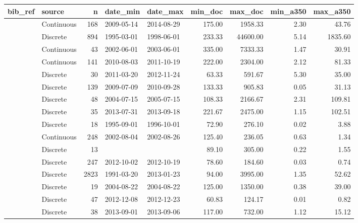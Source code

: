 \begin{table}[ht]
\centering
\begingroup\footnotesize
\begin{tabular}{llrllrrrr}
  \hline
bib\_ref & source & n & date\_min & date\_max & min\_doc & max\_doc & min\_a350 & max\_a350 \\ 
  \hline
\citet{agro} & Continuous & 168 & 2009-05-14 & 2014-08-29 & 175.00 & 1958.33 & 2.30 & 43.76 \\ 
  \citet{Aiken2005} & Discrete & 894 & 1995-03-01 & 1998-06-01 & 233.33 & 44600.00 & 5.14 & 1835.60 \\ 
  \citet{Anderson2007} & Continuous &  43 & 2002-06-01 & 2003-06-01 & 335.00 & 7333.33 & 1.47 & 30.91 \\ 
  \citet{Asmala2014} & Continuous & 141 & 2010-08-03 & 2011-10-19 & 222.00 & 2304.00 & 2.12 & 81.33 \\ 
  \citet{Bouillon2014} & Discrete &  30 & 2011-03-20 & 2012-11-24 & 63.33 & 591.67 & 5.30 & 35.00 \\ 
  \citet{Braun2015} & Discrete & 139 & 2009-07-09 & 2010-09-28 & 133.33 & 905.83 & 0.05 & 31.13 \\ 
  \citet{Breton2009} & Discrete &  48 & 2004-07-15 & 2005-07-15 & 108.33 & 2166.67 & 2.31 & 109.81 \\ 
  \citet{Brezonik2015} & Discrete &  35 & 2013-07-31 & 2013-09-18 & 221.67 & 2475.00 & 1.15 & 102.51 \\ 
  \citet{Castillo1999} & Discrete &  18 & 1995-09-01 & 1996-10-01 & 72.90 & 276.10 & 0.02 & 3.88 \\ 
  \citet{Conan2007} & Continuous & 248 & 2002-08-04 & 2002-08-26 & 125.40 & 236.05 & 0.63 & 1.34 \\ 
  \citet{Delcastillo2000} & Discrete &  13 &  &  & 89.10 & 305.00 & 0.22 & 1.55 \\ 
  \citet{Engel2015} & Discrete & 247 & 2012-10-02 & 2012-10-19 & 78.60 & 184.60 & 0.03 & 0.74 \\ 
  \citet{finish_rivers} & Discrete & 2823 & 1991-03-20 & 2013-01-23 & 94.00 & 3995.00 & 1.35 & 52.62 \\ 
  \citet{Forsstrom2015} & Discrete &  19 & 2004-08-22 & 2004-08-22 & 125.00 & 1350.00 & 0.38 & 39.00 \\ 
  \citet{Galgani2016} & Discrete &  47 & 2012-12-08 & 2012-12-23 & 60.83 & 124.17 & 0.01 & 0.82 \\ 
  \citet{Goncalves2015} & Discrete &  38 & 2013-09-01 & 2013-09-06 & 117.00 & 732.00 & 1.12 & 15.12 \\ 

\end{tabular}
\end{table}
